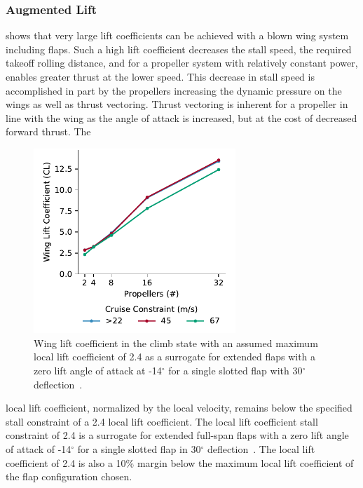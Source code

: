 \documentclass[conf]{new-aiaa}
\begin{document}
\subsubsection{Augmented Lift}


 shows that very large lift coefficients can be achieved with a blown wing system including flaps. Such a high lift coefficient decreases the stall speed, the required takeoff rolling distance, and for a propeller system with relatively constant power, enables greater thrust at the lower speed. This decrease in stall speed is accomplished in part by the propellers increasing the dynamic pressure on the wings as well as thrust vectoring. Thrust vectoring is inherent for a propeller in line with the wing as the angle of attack is increased, but at the cost of decreased forward thrust. The

\begin{figure}[h!]
    \centering
    \includegraphics[trim={0.3cm 0.25cm 0.0cm 0.25cm},clip,width=3.0in]{CL_climb}
    \caption{Wing lift coefficient in the climb state with an assumed maximum local lift coefficient of 2.4 as a surrogate for extended flaps with a zero lift angle of attack at -14$^\circ$ for a single slotted flap with 30$^\circ$ deflection~\cite{Abbott:2012aa}.}
    \label{fig:CL_climb}
\end{figure}



\noindent local lift coefficient, normalized by the local velocity, remains below the specified stall constraint of a 2.4 local lift coefficient. The local lift coefficient stall constraint of 2.4 is a surrogate for extended full-span flaps with a zero lift angle of attack of -14$^\circ$ for a single slotted flap in 30$^\circ$ deflection~\cite{Abbott:2012aa}. The local lift coefficient of 2.4 is also a 10\% margin below the maximum local lift coefficient of the flap configuration chosen.
\end{document}
